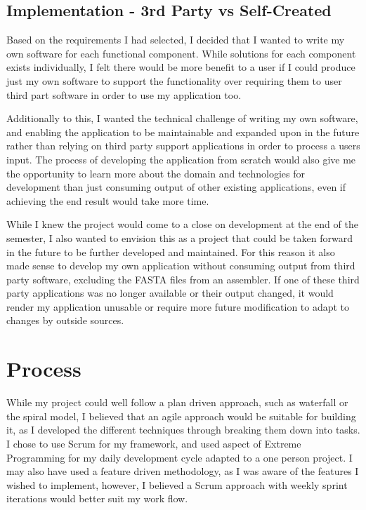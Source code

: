 \subsection{Implementation - 3rd Party vs Self-Created}
Based on the requirements I had selected, I decided that I wanted to write my own software for each functional component. While solutions for each component exists individually, I felt there would be more benefit to a user if I could produce just my own software to support the functionality over requiring them to user third part software in order to use my application too.

Additionally to this, I wanted the technical challenge of writing my own software, and enabling the application to be maintainable and expanded upon in the future rather than relying on third party support applications in order to process a users input. The process of developing the application from scratch would also give me the opportunity to learn more about the domain and technologies for development than just consuming output of other existing applications, even if achieving the end result would take more time.

While I knew the project would come to a close on development at the end of the semester, I also wanted to envision this as a project that could be taken forward in the future to be further developed and maintained. For this reason it also made sense to develop my own application without consuming output from third party software, excluding the FASTA files from an assembler. If one of these third party applications was no longer available or their output changed, it would render my application unusable or require more future modification to adapt to changes by outside sources.


\section{Process}
While my project could well follow a plan driven approach, such as waterfall or the spiral model, I believed that an agile approach would be suitable for building it, as I developed the different techniques through breaking them down into tasks. I chose to use Scrum for my framework, and used aspect of Extreme Programming for my daily development cycle adapted to a one person project. I may also have used a feature driven methodology, as I was aware of the features I wished to implement, however, I believed a Scrum approach with weekly sprint iterations would better suit my work flow.

